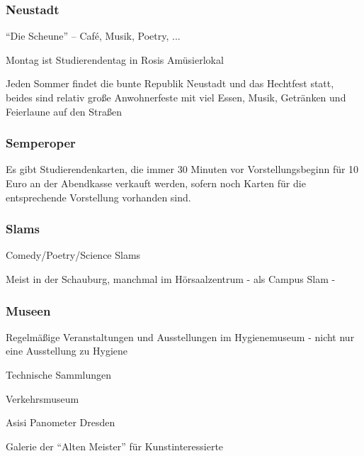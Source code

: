 \documentclass[a4paper,12pt]{scrreprt}
\begin{document}
\subsubsection{Neustadt}
\begin{itemize*}
    \item \enquote{Die Scheune} -- Café, Musik, Poetry, ...
    \item Montag ist Studierendentag in Rosis Amüsierlokal
    \item Jeden Sommer findet die bunte Republik Neustadt und das Hechtfest statt, beides sind relativ große Anwohnerfeste mit viel Essen, Musik, Getränken und Feierlaune auf den Straßen
\end{itemize*}

\subsubsection{Semperoper}
\begin{itemize*}
    \item Es gibt Studierendenkarten, die immer 30 Minuten vor Vorstellungsbeginn für 10 Euro an der Abendkasse verkauft werden, sofern noch Karten für die entsprechende Vorstellung vorhanden sind.
\end{itemize*}

\subsubsection{Slams}
\begin{itemize*}
    \item Comedy/Poetry/Science Slams
    \item Meist in der Schauburg, manchmal im Hörsaalzentrum - als Campus Slam -
\end{itemize*}

\subsubsection{Museen}
\begin{itemize*}
    \item Regelmäßige Veranstaltungen und Ausstellungen im Hygienemuseum - nicht nur eine Ausstellung zu Hygiene
    \item Technische Sammlungen
    \item Verkehrsmuseum
    \item Asisi Panometer Dresden
    \item Galerie der \enquote{Alten Meister} für Kunstinteressierte
\end{itemize*}
\end{document}
